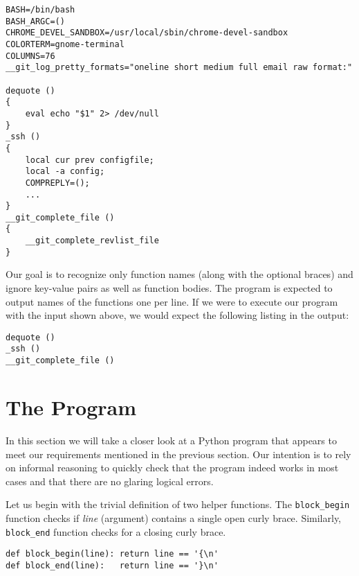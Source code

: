 \documentclass[10pt, a4paper]{article}
\begin{document}
{
\begin{lstlisting}
BASH=/bin/bash
BASH_ARGC=()
CHROME_DEVEL_SANDBOX=/usr/local/sbin/chrome-devel-sandbox
COLORTERM=gnome-terminal
COLUMNS=76
__git_log_pretty_formats="oneline short medium full email raw format:"

dequote ()
{
    eval echo "$1" 2> /dev/null
}
_ssh ()
{
    local cur prev configfile;
    local -a config;
    COMPREPLY=();
    ...
}
__git_complete_file ()
{
    __git_complete_revlist_file
}
\end{lstlisting}}

Our goal is to recognize only function names (along with the optional braces) and ignore key-value pairs as well as function bodies. The program is expected to output names of the functions one per line. If we were to execute our program with the input shown above, we would expect the following listing in the output:

{
\begin{lstlisting}
dequote ()
_ssh ()
__git_complete_file ()
\end{lstlisting}}

\section{The Program}
In this section we will take a closer look at a Python program that appears to meet our requirements mentioned in the previous section. Our intention is to rely on informal reasoning to quickly check that the program indeed works in most cases and that there are no glaring logical errors.

Let us begin with the trivial definition of two helper functions. The \texttt{block\_begin} function checks if \emph{line} (argument) contains a single open curly brace. Similarly, \texttt{block\_end} function checks for a closing curly brace.

\noindent
\begin{lstlisting}
def block_begin(line): return line == '{\n'
def block_end(line):   return line == '}\n'
\end{lstlisting}
\end{document}
